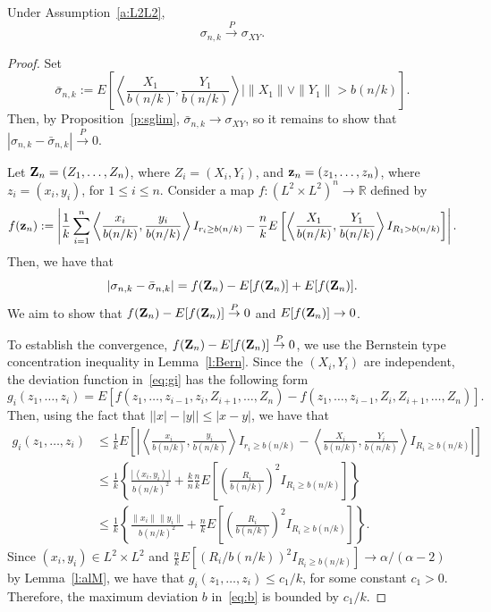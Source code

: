 \documentclass[lineno]{biometrika}
\newcommand \ag{\alpha}
\newcommand \sg{\sigma}
\newcommand\bz{{\bf z}}
\newcommand\bZ{{\bf Z}}
\newcommand\mbR{{\mathbb R}}
\newcommand\lp{\left (}
\newcommand\rp{\right )}
\newcommand\lb{\left [}
\newcommand\rb{\right ]}
\newcommand\lmo{\left |}
\newcommand\rmo{\right |}
\newcommand\lbr{\left \{}
\newcommand\rbr{\right \}}
\newcommand\lip{\left \langle}
\newcommand\rip{\right \rangle}
\def\convP{\stackrel{\mbox{$\scriptstyle P$}}{\rightarrow}}
\begin{document}
\begin{proposition} \label{p:bar}
Under Assumption~\ref{a:L2L2},
\[
\sg_{n,k} \convP \sg_{XY}.
\]
\end{proposition}

\begin{proof}

Set
\begin{equation} \label{eq:sgbar}
\bar{\sg}_{n,k} := E\lb \lip \frac{X_1}{b(n/k)}, \frac{Y_1}{b(n/k)} \rip \Bigg|\|X_1\| \vee \|Y_1\| >b(n/k)\rb.
\end{equation}
Then, by Proposition~\ref{p:sglim}, $\bar{\sg}_{n,k} \to \sg_{XY}$, so it remains to show that $|\sg_{n,k} - \bar{\sg}_{n,k}| \convP 0$.

Let $\bZ_n = (Z_1, \ldots, Z_n)$, where $Z_i = (X_i, Y_i)$, and $\bz_n = (z_1, \ldots, z_n)$, where $z_i = (x_i, y_i)$, for $1 \le i \le n$. Consider a map $f: (L^2 \times L^2)^n \to \mbR$ defined by
\[
f(\bz_n) := \lmo \frac{1}{k}\sum_{i=1}^n \lip \frac{x_i}{b(n/k)}, \frac{y_i}{b(n/k)} \rip I_{r_i \ge b(n/k) }- \frac{n}{k}E\lb \lip \frac{X_1}{b(n/k)}, \frac{Y_1}{b(n/k)} \rip I_{R_1 >b(n/k)}\rb \rmo.
\]
Then, we have that
\[
|\sg_{n,k} - \bar{\sg}_{n,k}| = f(\bZ_n) - E[f(\bZ_n)] + E[f(\bZ_n)].
\]
We aim to show that $f(\bZ_n) - E[f(\bZ_n)] \convP 0$ and $E[f(\bZ_n)] \to 0$.

To establish the convergence, $f(\bZ_n) - E[f(\bZ_n)] \convP 0$, we use the Bernstein type concentration inequality in Lemma~\ref{l:Bern}. Since the $(X_i,Y_i)$ are independent, the deviation function in~\eqref{eq:gi} has the following form
\[
g_i(z_1, \ldots, z_i)= E \lb f(z_1, \ldots, z_{i-1},z_i, Z_{i+1}, \ldots, Z_n)-f(z_1, \ldots, z_{i-1},Z_i, Z_{i+1}, \ldots, Z_n) \rb.
\]
Then, using the fact that $\lmo |x|- |y| \rmo \le |x-y|$, we have that
\begin{align*}
g_i(z_1, \ldots, z_i)
&\le \frac{1}{k} E\lb \lmo  \lip \frac{x_i}{b(n/k)}, \frac{y_i}{b(n/k)} \rip I_{r_i \ge b(n/k) } - \lip \frac{X_i}{b(n/k)}, \frac{Y_i}{b(n/k)} \rip I_{R_i \ge b(n/k) }       \rmo \rb \\
&\le \frac{1}{k} \lbr \frac{|\lip x_i, y_i\rip|}{b(n/k)^2} + \frac{k}{n} \frac{n}{k} E \lb \lp \frac{R_i}{b(n/k)} \rp^2 I_{R_i \ge b(n/k) }  \rb \rbr\\
&\le \frac{1}{k} \lbr \frac{\|x_i\| \| y_i\|}{b(n/k)^2} + \frac{n}{k} E \lb \lp \frac{R_i}{b(n/k)} \rp^2 I_{R_i \ge b(n/k) }  \rb \rbr.
\end{align*}
Since $(x_i,y_i) \in L^2\times L^2$ and $\frac{n}{k} E \lb \lp {R_i}/{b(n/k)} \rp^2 I_{R_i \ge b(n/k) }  \rb \to \ag/(\ag-2)$ by Lemma~\ref{l:alM},  we have that $g_{i}(z_1, \ldots, z_i) \le {c_1}/{k}$, for some constant $c_1>0$. Therefore, the maximum deviation $b$ in~\eqref{eq:b} is bounded by $c_1/k$.


\end{proof}
\end{document}
